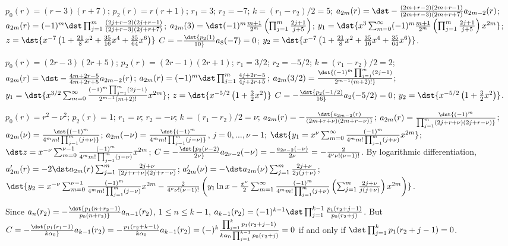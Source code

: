 \documentclass[dvips]{book}
\renewcommand{\exer}[1]{\par\medskip\;\noindent{\color{red}\bf #1.}}
\numberwithin{example}{section}
\numberwithin{equation}{section}
\numberwithin{theorem}{section}
\numberwithin{table}{section}
\numberwithin{figure}{section}
\begin{document}
\exer{7.7.38}
$p_0(r)=(r-3)(r+7)$;
$p_2(r)=r(r+1)$;
$r_1=3$; $r_2=-7$; $k=(r_1-r_2)/2=5$;
$a_{2m}(r)=\dst-{(2m+r-2)(2m+r-1)\over(2m+r-3)(2m+r+7)}
a_{2m-2}(r)$;
$a_{2m}(r)=(-1)^m\dst\prod_{j=1}^m{(2j+r-2)(2j+r-1)\over(2j+r-3)(2j+r+7)}$;
$a_{2m}(3)=\dst (-1)^m{m+1\over2^m}\left(\prod_{j=1}^m{2j+1\over
j+5}\right)$;
$y_1=\dst{x^3\sum_{m=0}^\infty(-1)^m{m+1\over2^m}\left(\prod_{j=1}^m{2j+1\over
j+5}\right)x^{2m}}$;
$z=\dst{x^{-7}\left(1+{21\over8}x^2+{35\over16}x^4+{35\over64}x^6\right)}$
$C=-\dst{p_2(1)\over10}a_8(-7)=0$;
$y_2=\dst{x^{-7}\left(1+{21\over8}x^2+{35\over16}x^4+{35\over64}x^6\right)}$.


\exer{7.7.40}
$p_0(r)=(2r-3)(2r+5)$;
$p_2(r)=(2r-1)(2r+1)$;
$r_1=3/2$; $r_2=-5/2$; $k=(r_1-r_2)/2=2$;
$a_{2m}(r)=\dst-{4m+2r-5\over4m+2r+5}
a_{2m-2}(r)$;
 $a_{2m}(r)=(-1)^m\dst\prod_{j=1}^m{4j+2r-5\over4j+2r+5}$;
$a_{2m}(3/2)=\dst{(-1)^m \prod_{j=1}^m(2j-1)\over2^{m-1}(m+2)!}$;
$y_1=\dst{x^{3/2}\sum_{m=0}^\infty{(-1)^m
\prod_{j=1}^m(2j-1)\over2^{m-1}(m+2)!}x^{2m}}$;
$z=\dst{x^{-5/2}\left(1+{3\over2}x^2\right)}$
$C=-\dst{p_2(-1/2)\over16}a_2(-5/2)=0$;
$y_2=\dst{x^{-5/2}\left(1+{3\over2}x^2\right)}$.


\exer{7.7.42} $p_0(r)=r^2-\nu^2$; $p_2(r)=1$; $r_1=\nu$;
$r_2=-\nu$; $k=(r_1-r_2)/2=\nu$;
$a_{2m}(r)=-\dst{a_{2m-2}(r)\over(2m+r+\nu)(2m+r-\nu)}$;
$a_{2m}(r)=\dst{(-1)^m\over\prod_{j=1}^m(2j+r+\nu)(2j+r-\nu)}$;
$a_{2m}(\nu)=\dst{(-1)^m\over4^mm!\prod_{j=1}^m(j+\nu)}$;
$a_{2m}(-\nu)=\dst{(-1)^m\over4^mm!\prod_{j=1}^m(j-\nu)}$,
$j=0,\dots,\nu-1$; $\dst{y_1=x^\nu\sum_{m=0}^\infty{(-1)^m\over4^mm!
\prod_{j=1}^m(j+\nu)}x^{2m}}$; $\dst
z=x^{-\nu}\sum_{m=0}^{\nu-1}{(-1)^m\over4^mm!
\prod_{j=1}^m(j-\nu)}x^{2m}$; $C=-\dst{p_2(\nu-2)\over
2\nu}a_{2\nu-2}(-\nu)= -{a_{2\nu-2}(-\nu)\over 2\nu}=
-{2\over4^\nu\nu!(\nu-1)!}$. By logarithmic differentiation,
$a_{2m}'(r)=-2\dst
a_{2m}(r)\sum_{j=1}^m{2j+\nu\over(2j+r+\nu)(2j+r-\nu)}$;
$a_{2m}'(\nu)=-\dst a_{2m}(\nu)\sum_{j=1}^m{2j+\nu\over2j(j+\nu)}$;
$\dst{y_2=x^{-\nu}\sum_{m=0}^{\nu-1}{(-1)^m\over4^mm!\prod_{j=1}^m(j-\nu)}x^{2m}
-{2\over4^\nu\nu!(\nu-1)!}\left(y_1 \ln x-{x^\nu\over2}
\sum_{m=1}^\infty{(-1)^m\over4^mm!\prod_{j=1}^m(j+\nu)}
\left(\sum_{j=1}^m{2j+\nu\over j(j+\nu)}\right) x^{2m}\right)}$.



\exer{7.7.44}
Since
$a_n(r_2)=-\dst{p_1(n+r_2-1)\over p_0(n+r_2)}a_{n-1}(r_2)$,
$1\le n\le k-1$, $a_{k-1}(r_2)=(-1)^{k-1}\dst\prod_{j=1}^{k-1}
{p_1(r_2+j-1)\over p_0(r_2+j)}$. But $C=-\dst{p_1(r_1-1)\over
k\alpha_0}a_{k-1}(r_2)=-{p_1(r_2+k-1)\over k\alpha_0}a_{k-1}(r_2)
=(-)^k{\prod_{j=1}^kp_1(r_2+j-1)\over k\alpha_0\prod_{j=1}^{k-1}
p_0(r_2+j)}=0$ if and only if $\dst\prod_{j=1}^kp_1(r_2+j-1)=0$.
\end{document}
